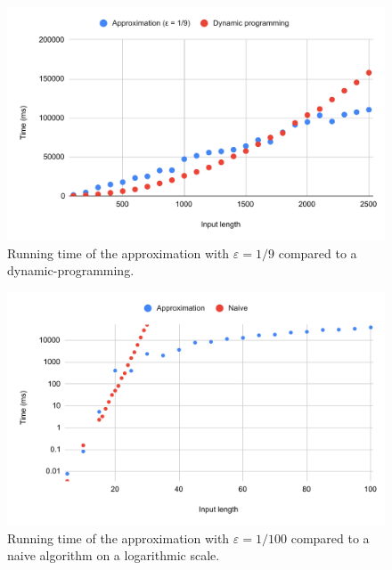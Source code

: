 \begin{figure}[h!]
    \centering
    \includegraphics[width=\linewidth]{charts/dp.pdf}
    \caption{Running time of the approximation with $\varepsilon = 1/9$ compared to a dynamic-programming.}
    \label{fig:chart}
\end{figure}


\begin{figure}[h!]
    \centering
    \includegraphics[width=\linewidth]{charts/naive.pdf}
    \caption{Running time of the approximation with $\varepsilon = 1/100$ compared to a naive algorithm on a logarithmic scale.}
    \label{fig:chart}
\end{figure}


